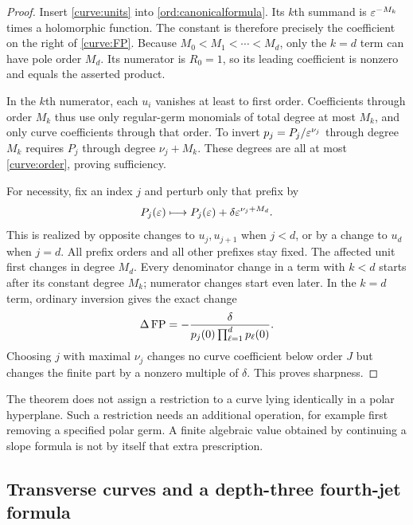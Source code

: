 \begin{proof}
Insert \eqref{curve:units} into \eqref{ord:canonicalformula}. Its $k$th
summand is $\varepsilon^{-M_k}$ times a holomorphic function. The constant is
therefore precisely the coefficient on the right of \eqref{curve:FP}.
Because $M_0<M_1<\cdots<M_d$, only the $k=d$ term can have pole order
$M_d$. Its numerator is $R_0=1$, so its leading coefficient is nonzero
and equals the asserted product.

In the $k$th numerator, each $u_i$ vanishes at least to first order.
Coefficients through order $M_k$ thus use only regular-germ monomials
of total degree at most $M_k$, and only curve coefficients through
that order. To invert $p_j=P_j/\varepsilon^{\nu_j}$ through degree $M_k$
requires $P_j$ through degree $\nu_j+M_k$. These degrees are all at
most \eqref{curve:order}, proving sufficiency.

For necessity, fix an index $j$ and perturb only that prefix by
\begin{equation}\label{curve:perturb}
 P_j(\varepsilon)\longmapsto P_j(\varepsilon)+
                       \delta\varepsilon^{\nu_j+M_d}.
\end{equation}
This is realized by opposite changes to $u_j,u_{j+1}$ when $j<d$,
or by a change to $u_d$ when $j=d$. All prefix orders and all other
prefixes stay fixed. The affected unit first changes in degree $M_d$.
Every denominator change in a term with $k<d$ starts after its constant
degree $M_k$; numerator changes start even later. In the $k=d$ term,
ordinary inversion gives the exact change
\begin{equation}\label{curve:sharpchange}
 \Delta\operatorname{FP}=-\frac{\delta}
 {p_j(0)\prod_{\ell=1}^d p_\ell(0)}.
\end{equation}
Choosing $j$ with maximal $\nu_j$ changes no curve coefficient below
order $J$ but changes the finite part by a nonzero multiple of
$\delta$. This proves sharpness.
\end{proof}

The theorem does not assign a restriction to a curve lying identically
in a polar hyperplane. Such a restriction needs an additional
operation, for example first removing a specified polar germ. A
finite algebraic value obtained by continuing a slope formula is not
by itself that extra prescription.

\subsection{Transverse curves and a depth-three fourth-jet formula}

